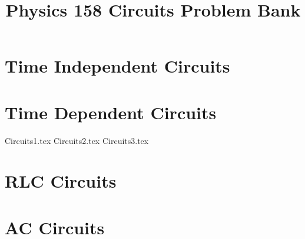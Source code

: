 \documentclass[11pt, fleqn]{article}
\title{Physics 158 Circuits Problem Bank}
\author{}
\date{}
\begin{document}
\allowdisplaybreaks

\maketitle

\section*{Time Independent Circuits}

\section*{Time Dependent Circuits}
{Circuits1.tex}
{Circuits2.tex}
{Circuits3.tex}

\section*{RLC Circuits}

\section*{AC Circuits}
\end{document}
